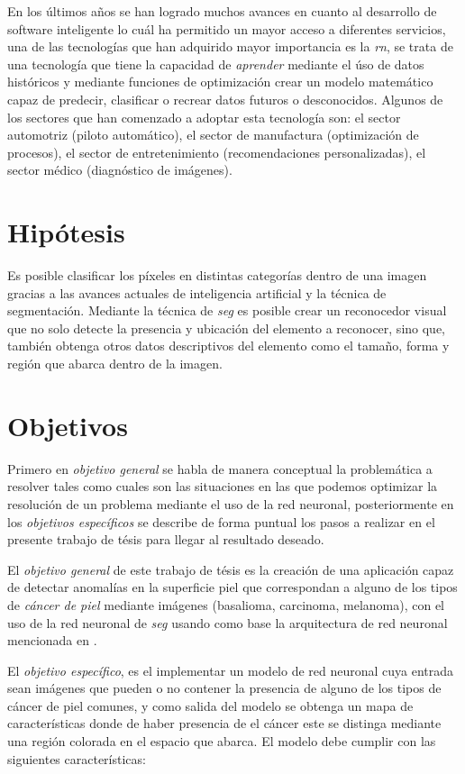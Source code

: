 En los últimos años se han logrado muchos avances en cuanto al desarrollo de software inteligente lo cuál ha permitido un mayor acceso a diferentes servicios, una de las tecnologías que han adquirido mayor importancia es la \emph{\gls{rn}}, se trata de una tecnología que tiene la capacidad de \emph{aprender} mediante el úso de datos históricos y mediante funciones de optimización crear un modelo matemático capaz de predecir, clasificar o recrear datos futuros o desconocidos. Algunos de los sectores que han comenzado a adoptar esta tecnología son: el sector automotriz (piloto automático), el sector de manufactura (optimización de procesos), el sector de entretenimiento (recomendaciones personalizadas), el sector médico (diagnóstico de imágenes). 


\section{Hipótesis}
Es posible clasificar los píxeles en distintas categorías dentro de una imagen gracias a las avances actuales de inteligencia artificial y la técnica de segmentación. Mediante la técnica de \emph{\gls{seg}} es posible crear un reconocedor visual que no solo detecte la presencia y ubicación del elemento a reconocer, sino que, también obtenga otros datos descriptivos del elemento como el tamaño, forma y región que abarca dentro de la imagen.

\section{Objetivos}
Primero en \emph{objetivo general} se habla de manera conceptual la problemática a resolver tales como cuales son las situaciones en las que podemos optimizar la resolución de un problema mediante el uso de la red neuronal, posteriormente en los \emph{objetivos específicos} se describe de forma puntual los pasos a realizar en el presente trabajo de tésis para llegar al resultado deseado.

El \emph{objetivo general} de este trabajo de tésis es la creación de una aplicación capaz de detectar anomalías en la superficie piel que correspondan a alguno de los tipos de \emph{cáncer de piel} mediante imágenes (basalioma, carcinoma, melanoma), con el uso de la red neuronal de \emph{\gls{seg}} usando como base la arquitectura de red neuronal mencionada en \citet{wu2019fastfcn}. 


El \emph{objetivo específico}, es el implementar un modelo de red neuronal cuya entrada sean imágenes que pueden o no contener la presencia de alguno de los tipos de cáncer de piel comunes, y como salida del modelo se obtenga un mapa de características donde de haber presencia de el cáncer este se distinga mediante una región colorada en el espacio que abarca. El modelo debe cumplir con las siguientes características:

